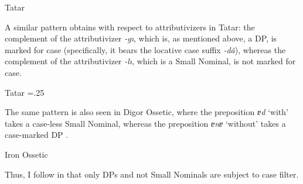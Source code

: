\documentclass[output=paper]{langsci/langscibook}
\begin{document}
\ea%
    \label{pereex:14}
    Tatar 
    \z 
\z 

A similar pattern obtains with respect to attributivizers in Tatar: 
the complement of the attributivizer \textit{{}-gı}, which is, as mentioned above, a DP, is marked for case 
(specifically, it bears the locative case suffix \textit{\nobreakdash-dä}), 
whereas the complement of the attributivizer \textit{\nobreakdash-lı}, which is a Small Nominal, is not marked for case.

\ea%
    \label{pereex:15}
    Tatar 
    \multicolsep=.25\baselineskip
    \begin{multicols}{2}
    \z 
    \end{multicols}
\z 

The same pattern is also seen in Digor Ossetic, where the preposition \textit{ɐd} ‘with’ takes a case-less Small Nominal, 
whereas the preposition \textit{ɐnɐ} ‘without’ takes a case-marked DP \citep{Erschler2019a}. 

\ea%
    \label{pereex:16}
    Iron Ossetic 
    \z
\z 
         
Thus, I follow \citet{Danon2006} in that only DPs and not Small Nominals are subject to case filter.
\end{document}

